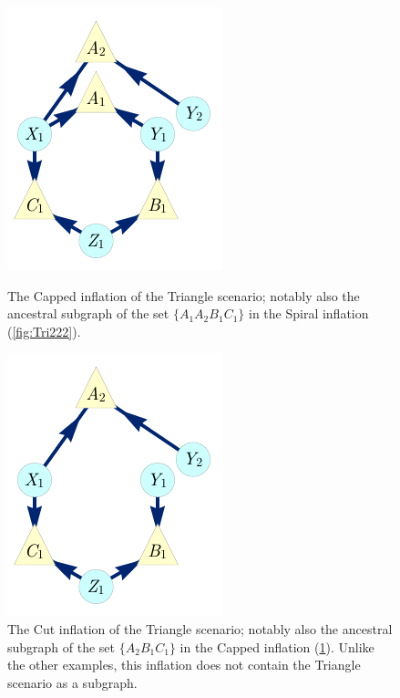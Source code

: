 \documentclass[aps,english,superscriptaddress,onecolumn,twoside,longbibliography,pra,floatfix,fleqn,nofootinbib]{revtex4-1}%
\theoremstyle{definition}
\newcommand{\SmallNamedFunction}[3][]{\operatorname{\mathsf{#2}}_{#1}\parenths{#3}}
\newcommand{\ansubgraph}[2][]{\SmallNamedFunction[#1]{AnSubDAG}{#2}}
\DeclarePairedDelimiter{\parenths}{\lparen}{\rparen}
\begin{document}
\begin{figure}[hb]
\centering
\begin{minipage}[t]{0.3\linewidth}
\centering
\includegraphics[scale=1]{broadcastingexamplenohighlightALT.pdf}
\caption{The Capped inflation of the Triangle scenario; notably also the ancestral subgraph of the set $\{ A_1 A_2 B_1 C_1\}$ in the Spiral inflation (\cref{fig:Tri222}).}
\label{fig:simpleinflation}
\end{minipage}\hfill
\begin{minipage}[t]{0.275\linewidth}
\centering
\includegraphics[scale=1]{nobroadcastingexamplenohighlightALT.pdf}
\caption{The Cut inflation of the Triangle scenario; notably also the ancestral subgraph of the set $\{ A_2 B_1 C_1\}$ in the Capped inflation (\cref{fig:simpleinflation}). Unlike the other examples, this inflation does not contain the Triangle scenario as a subgraph. 
}\color{black}

\end{minipage}
\end{figure}
\end{document}
